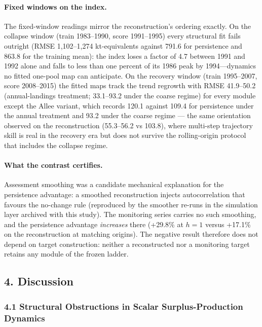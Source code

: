 \documentclass[11pt]{article}
\begin{document}
\paragraph{Fixed windows on the
index.}\label{fixed-windows-on-the-index.}

The fixed-window readings mirror the reconstruction's ordering exactly.
On the collapse window (train 1983--1990, score 1991--1995) every
structural fit fails outright (RMSE 1,102--1,274 kt-equivalents against
791.6 for persistence and 863.8 for the training mean): the index loses
a factor of 4.7 between 1991 and 1992 alone and falls to less than one
percent of its 1986 peak by 1994---dynamics no fitted one-pool map can
anticipate. On the recovery window (train 1995--2007, score 2008--2015)
the fitted maps track the trend regrowth with RMSE 41.9--50.2
(annual-landings treatment; 33.1--93.2 under the coarse regime) for
every module except the Allee variant, which records 120.1 against 109.4
for persistence under the annual treatment and 93.2 under the coarse
regime --- the same orientation observed on the reconstruction
(55.3--56.2 vs 103.8), where multi-step trajectory skill is real in the
recovery era but does not survive the rolling-origin protocol that
includes the collapse regime.

\paragraph{What the contrast
certifies.}\label{what-the-contrast-certifies.}

Assessment smoothing was a candidate mechanical explanation for the
persistence advantage: a smoothed reconstruction injects autocorrelation
that favours the no-change rule (reproduced by the smoother re-runs in
the simulation layer archived with this study). The monitoring series
carries no such smoothing, and the persistence advantage
\emph{increases} there (+29.8\% at \(h=1\) versus +17.1\% on the
reconstruction at matching origins). The negative result therefore does
not depend on target construction: neither a reconstructed nor a
monitoring target retains any module of the frozen ladder.

\subsection{4. Discussion}\label{discussion}

\subsubsection{4.1 Structural Obstructions in Scalar Surplus-Production
Dynamics}\label{structural-obstructions-in-scalar-surplus-production-dynamics}
\end{document}
